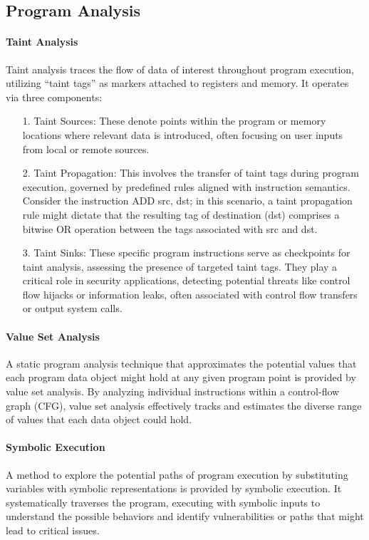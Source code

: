 \subsection{Program Analysis}

\paragraph{\textbf{Taint Analysis}}
%
Taint analysis traces the flow of data of interest throughout
program execution, utilizing ``taint tags'' as markers attached
to registers and memory. It
operates via three components:

\begin{enumerate}
%
  \item[1.] Taint Sources: These denote points within the program or memory
locations where relevant data is introduced, often focusing on user inputs
from local or remote sources.
%  
  \item[2.] Taint Propagation: This involves the transfer of taint tags
during program execution, governed by predefined rules aligned with
instruction semantics. Consider the instruction ADD src, dst; in this
scenario, a taint propagation rule might dictate that the resulting tag of
destination (dst) comprises a bitwise OR operation between the tags
associated with src and dst.
%  
  \item[3.] Taint Sinks: These specific program instructions serve as
checkpoints for taint analysis, assessing the presence of targeted taint
tags. They play a critical role in security applications, detecting
potential threats like control flow hijacks or information leaks, often
associated with control flow transfers or output system calls.
%  
\end{enumerate}

\paragraph{\textbf{Value Set Analysis}} A static program analysis technique
that approximates the potential values that each program data object might
hold at any given program point is provided by value set analysis. By
analyzing individual instructions within a control-flow graph (CFG), value
set analysis effectively tracks and estimates the diverse range of values
that each data object could hold. 

\paragraph{\textbf{Symbolic Execution}} A method to explore the potential
paths of program execution by substituting variables with symbolic
representations is provided by symbolic execution. It systematically
traverses the program, executing with symbolic inputs to understand the
possible behaviors and identify vulnerabilities or paths that might lead to
critical issues.

